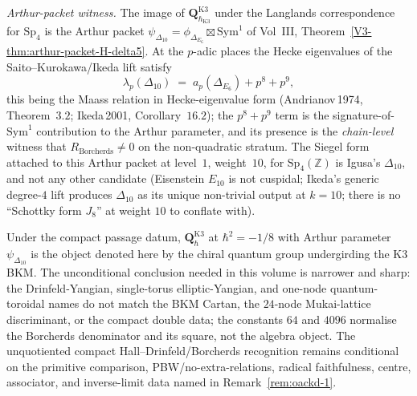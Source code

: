 \begin{remark}
\smallskip
\noindent\emph{Arthur-packet witness.}
The image of $\mathbf{Q}^{\mathrm{K3}}_{\hbar_{\mathrm{K3}}}$ under
the Langlands correspondence for $\mathrm{Sp}_4$ is the Arthur
packet $\psi_{\Delta_{10}} = \phi_{\Delta_{E_6}}\boxtimes\mathrm{Sym}^1$
of Vol~III,
Theorem~\textup{\ref{V3-thm:arthur-packet-H-delta5}}. At the $p$-adic
places the Hecke eigenvalues of the Saito--Kurokawa/Ikeda lift
satisfy
\[
 \lambda_p(\Delta_{10}) \;=\; a_p(\Delta_{E_6}) + p^{8} + p^{9},
\]
this being the Maass relation in Hecke-eigenvalue form
\textup{(}Andrianov\,1974, Theorem~$3.2$; Ikeda\,2001,
Corollary~$16.2$\textup{)}; the $p^{8} + p^{9}$ term is the
signature-of-$\mathrm{Sym}^1$ contribution to the Arthur parameter,
and its presence is the \emph{chain-level} witness that
$R_{\mathrm{Borcherds}} \ne 0$ on the non-quadratic stratum.
The Siegel form attached to this Arthur packet at level~$1$,
weight~$10$, for $\mathrm{Sp}_4(\mathbb{Z})$ is Igusa's
$\Delta_{10}$, and not any other candidate
\textup{(}Eisenstein $E_{10}$ is not cuspidal; Ikeda's generic
degree-$4$ lift produces $\Delta_{10}$ as its unique non-trivial
output at $k=10$; there is no ``Schottky form $J_8$'' at weight $10$
to conflate with\textup{)}.

Under the compact passage datum, $\mathbf{Q}^{\mathrm{K3}}_{\hbar}$
at $\hbar^{2} = -1/8$ with Arthur parameter
$\psi_{\Delta_{10}}$ is the object denoted here by the chiral quantum
group undergirding the K3 BKM. The unconditional conclusion needed in
this volume is narrower and sharp: the Drinfeld-Yangian,
single-torus elliptic-Yangian, and one-node quantum-toroidal names do
not match the BKM Cartan, the $24$-node Mukai-lattice discriminant,
or the compact double data; the constants \(64\) and \(4096\) normalise
the Borcherds denominator and its square, not the algebra object.
The unquotiented compact Hall--Drinfeld/Borcherds recognition remains
conditional on the primitive comparison, PBW/no-extra-relations,
radical faithfulness, centre, associator, and inverse-limit data named
in Remark~\textup{\ref{rem:oackd-1}}.
\end{remark}

